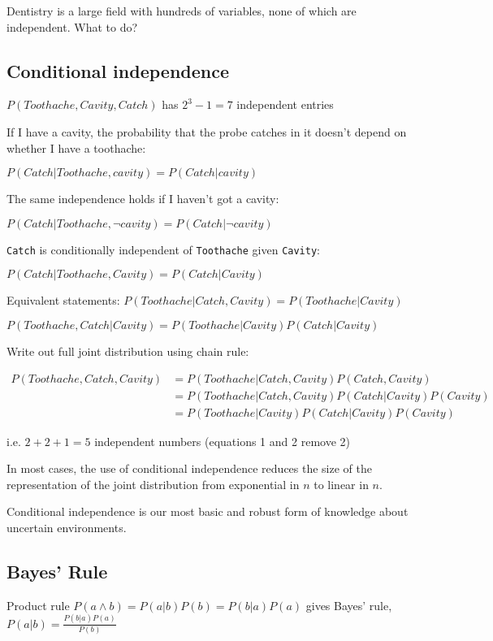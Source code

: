 Dentistry is a large field with hundreds of variables, none of which are
independent. What to do?

\subsection{Conditional independence}
$P(Toothache,Cavity,Catch)$ has $2^3 - 1 = 7$ independent entries

If I have a cavity, the probability that the probe catches in it doesn't depend
on whether I have a toothache:

$P(Catch|Toothache,cavity) = P(Catch|cavity)$

The same independence holds if I haven't got a cavity:

$P(Catch|Toothache,\neg cavity) = P(Catch|\neg cavity)$

\verb|Catch| is conditionally independent of \verb|Toothache| given
\verb|Cavity|:

$P(Catch|Toothache,Cavity) = P(Catch|Cavity)$

Equivalent statements: $P(Toothache|Catch,Cavity) = P(Toothache|Cavity)$

$P(Toothache,Catch|Cavity) = P(Toothache|Cavity)P(Catch|Cavity)$

Write out full joint distribution using chain rule:

\begin{align*}
    P(Toothache,Catch,Cavity) &= P(Toothache|Catch,Cavity)P(Catch,Cavity)\\
                              &= P(Toothache|Catch,Cavity)P(Catch|Cavity)P(Cavity)\\
                              &= P(Toothache|Cavity)P(Catch|Cavity)P(Cavity)
\end{align*}

i.e. $2 + 2 + 1 = 5$ independent numbers (equations 1 and 2 remove 2)

In most cases, the use of conditional independence reduces the size of the
representation of the joint distribution from exponential in $n$ to linear in
$n$.

Conditional independence is our most basic and robust form of knowledge about
uncertain environments.

\subsection{Bayes' Rule}
Product rule $P(a \land b) = P(a|b)P(b) = P(b|a)P(a)$ gives Bayes' rule,
$P(a|b) = \frac{P(b|a)P(a)}{P(b)}$

